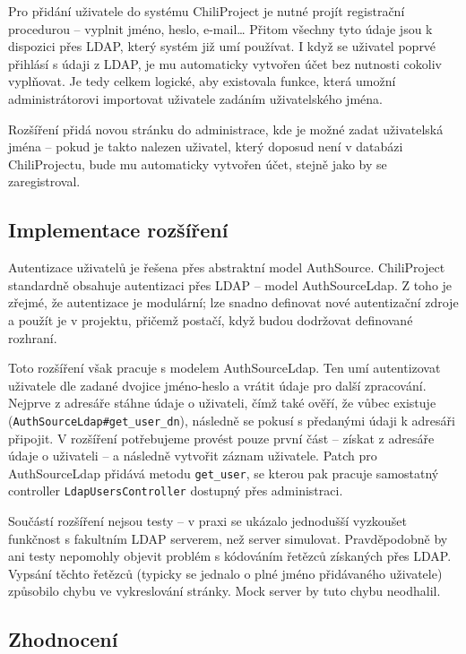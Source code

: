 \documentclass[thesis=B,czech]{FITthesis}[2012/05/02]
\begin{document}
Pro přidání uživatele do systému ChiliProject je nutné projít
registrační procedurou -- vyplnit jméno, heslo, e-mail\ldots{} Přitom
všechny tyto údaje jsou k dispozici přes \gls{LDAP}, který systém již
umí používat. I když se uživatel poprvé přihlásí s údaji z \gls{LDAP},
je mu automaticky vytvořen účet bez nutnosti cokoliv vyplňovat. Je tedy
celkem logické, aby existovala funkce, která umožní administrátorovi
importovat uživatele zadáním uživatelského jména.

Rozšíření přidá novou stránku do administrace, kde je možné zadat
uživatelská jména -- pokud je takto nalezen uživatel, který doposud není
v databázi ChiliProjectu, bude mu automaticky vytvořen účet, stejně jako
by se zaregistroval.

\subsection{Implementace rozšíření}

Autentizace uživatelů je řešena přes abstraktní model AuthSource.
ChiliProject standardně obsahuje autentizaci přes \gls{LDAP} -- model
AuthSourceLdap. Z toho je zřejmé, že autentizace je modulární; lze
snadno definovat nové autentizační zdroje a použít je v projektu, přičemž
postačí, když budou dodržovat definované rozhraní.

Toto rozšíření však pracuje s modelem AuthSourceLdap. Ten umí
autentizovat uživatele dle zadané dvojice jméno-heslo a vrátit údaje pro
další zpracování. Nejprve z adresáře stáhne údaje o uživateli, čímž
také ověří, že vůbec existuje
(\lstinline!AuthSourceLdap#get_user_dn!), následně se pokusí s předanými
údaji k adresáři připojit. V rozšíření potřebujeme provést pouze první
část -- získat z adresáře údaje o uživateli -- a následně vytvořit
záznam uživatele. Patch pro AuthSourceLdap přidává metodu
\lstinline!get_user!, se kterou pak pracuje samostatný controller
\lstinline!LdapUsersController! dostupný přes administraci.

Součástí rozšíření nejsou testy -- v praxi se ukázalo jednodušší
vyzkoušet funkčnost s fakultním LDAP serverem, než server simulovat.
Pravděpodobně by ani testy nepomohly objevit problém s kódováním řetězců
získaných přes LDAP. Vypsání těchto řetězců (typicky se jednalo o plné
jméno přidávaného uživatele) způsobilo chybu ve vykreslování stránky.
Mock server by tuto chybu neodhalil.

\subsection{Zhodnocení}
\end{document}
